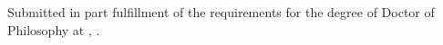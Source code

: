 \begin{titlepage}

  \center%
  \textsc{\LARGE \thesisUniversity}\\[1.0cm]
  \textsc{\Large \thesisDepartment}
  \vfill
  {\Huge \bf \thesisTitle}\\[2.5cm]
  {\Large \thesisAuthor}
  \vfill

  \large
  Submitted in part fulfillment of the requirements for the degree of Doctor of
  Philosophy at \thesisUniversity, \thesisSubmitDate.

\end{titlepage}
